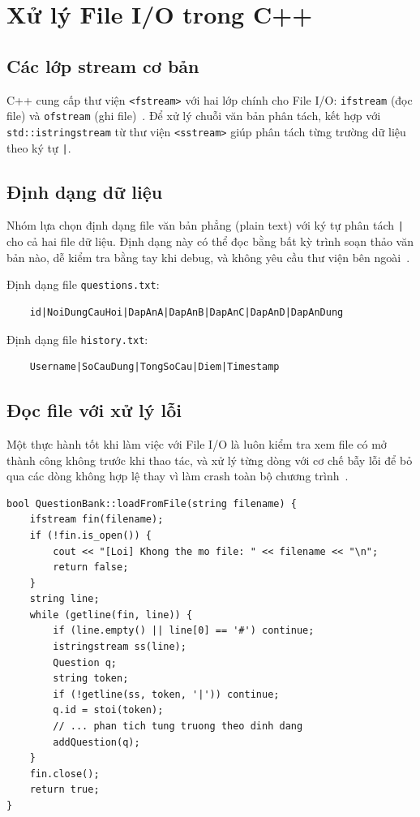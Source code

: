 \documentclass[11pt]{report}
\begin{document}
\section{Xử lý File I/O trong C++}

\subsection{Các lớp stream cơ bản}

C++ cung cấp thư viện \texttt{<fstream>} với hai lớp chính cho File I/O: \texttt{ifstream} (đọc file) và \texttt{ofstream} (ghi file)~\cite{stroustrup2013}. Để xử lý chuỗi văn bản phân tách, kết hợp với \texttt{std::istringstream} từ thư viện \texttt{<sstream>} giúp phân tách từng trường dữ liệu theo ký tự \texttt{|}.

\subsection{Định dạng dữ liệu}

Nhóm lựa chọn định dạng file văn bản phẳng (plain text) với ký tự phân tách \texttt{|} cho cả hai file dữ liệu. Định dạng này có thể đọc bằng bất kỳ trình soạn thảo văn bản nào, dễ kiểm tra bằng tay khi debug, và không yêu cầu thư viện bên ngoài~\cite{stroustrup2013}.

Định dạng file \texttt{questions.txt}:
\begin{verbatim}
    id|NoiDungCauHoi|DapAnA|DapAnB|DapAnC|DapAnD|DapAnDung
\end{verbatim}

Định dạng file \texttt{history.txt}:
\begin{verbatim}
    Username|SoCauDung|TongSoCau|Diem|Timestamp
\end{verbatim}

\subsection{Đọc file với xử lý lỗi}

Một thực hành tốt khi làm việc với File I/O là luôn kiểm tra xem file có mở thành công không trước khi thao tác, và xử lý từng dòng với cơ chế bẫy lỗi để bỏ qua các dòng không hợp lệ thay vì làm crash toàn bộ chương trình~\cite{stroustrup2013}.

\begin{lstlisting}[caption={Đọc file câu hỏi với kiểm tra lỗi từng dòng}, label={lst:fileread}]
bool QuestionBank::loadFromFile(string filename) {
    ifstream fin(filename);
    if (!fin.is_open()) {
        cout << "[Loi] Khong the mo file: " << filename << "\n";
        return false;
    }
    string line;
    while (getline(fin, line)) {
        if (line.empty() || line[0] == '#') continue;
        istringstream ss(line);
        Question q;
        string token;
        if (!getline(ss, token, '|')) continue;
        q.id = stoi(token);
        // ... phan tich tung truong theo dinh dang
        addQuestion(q);
    }
    fin.close();
    return true;
}
\end{lstlisting}
\end{document}
